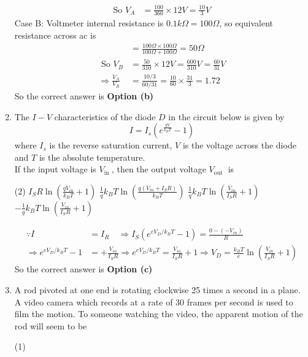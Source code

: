 \begin{enumerate}
\begin{answer}
\begin{align*}
	\text{So }V_{A} &=\frac{100}{360} \times 12 V=\frac{10}{3} V
	\end{align*}
	Case B: Voltmeter internal resistance is $0.1 k \Omega=100 \Omega$, so equivalent resistance across ac is
	\begin{align*}
	&=\frac{100 \Omega \times 100 \Omega}{100 \Omega+100 \Omega}=50 \Omega\\
	\text { So } V_{B}&=\frac{50}{310} \times 12 V=\frac{600}{310} V=\frac{60}{31} V\\
	\Rightarrow \frac{V_{A}}{V_{B}}&=\frac{10 / 3}{60 / 31}=\frac{10}{60} \times \frac{31}{3}=1.72
	\end{align*}
	So the correct answer is \textbf{Option (b)}
\end{answer}
\item  The $I-V$ characteristics of the diode $D$ in the circuit below is given by
$$
I=I_{s}\left(e^{\frac{q V}{k_{B} T}}-1\right)
$$
where $I_{s}$ is the reverse saturation current, $V$ is the voltage across the diode and $T$ is the absolute temperature.\\
If the input voltage is $V_{\text {in }}$, then the output voltage $V_{\text {out }}$ is
 \begin{tasks}(2)
	\task[\textbf{a.}]$I_{S} R \ln \left(\frac{q V_{i n}}{k_{B} T}+1\right)$
	\task[\textbf{b.}]$\frac{1}{q} k_{B} T \ln \left(\frac{q\left(V_{i n}+I_{S} R\right)}{k_{B} T}\right)$
	\task[\textbf{c.}]$\frac{1}{q} k_{B} T \ln \left(\frac{V_{i n}}{I_{S} R}+1\right)$
	\task[\textbf{d.}] $-\frac{1}{q} k_{B} T \ln \left(\frac{V_{i n}}{I_{S} R}+1\right)$
\end{tasks}
\begin{answer}
	\begin{align*}
	\because I&=I_{R} \quad \Rightarrow I_{S}\left(e^{e V_{D} / k_{B} T}-1\right)=\frac{0-\left(-V_{i n}\right)}{R}\\
	\Rightarrow e^{e V_{D} / k_{B} T}-1&=+\frac{V_{i n}}{I_{S} R} \Rightarrow e^{e V_{D} / k_{B} T}=\frac{V_{i n}}{I_{S} R}+1 \Rightarrow V_{D}=\frac{k_{B} T}{e} \ln \left(\frac{V_{i n}}{I_{S} R}+1\right)
	\end{align*}
		So the correct answer is \textbf{Option (c)}
\end{answer}
\item A rod pivoted at one end is rotating clockwise 25 times a second in a plane. A video camera which records at a rate of 30 frames per second is used to film the motion. To someone watching the video, the apparent motion of the rod will seem to be
 \begin{tasks}(1)

\end{tasks}
\end{enumerate}
